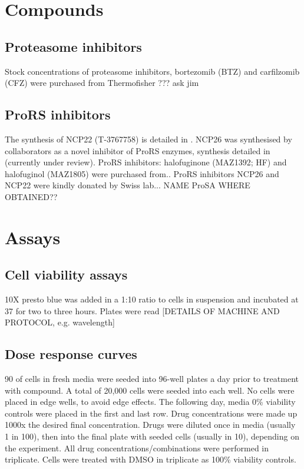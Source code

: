 \section{Compounds}

\subsection{Proteasome inhibitors}
Stock concentrations of proteasome inhibitors, bortezomib (BTZ) and carfilzomib (CFZ) were purchased from Thermofisher ??? ask jim

\subsection{ProRS inhibitors}
The synthesis of NCP22 (T-3767758) is detailed in \cite{adachi2017discovery}.
NCP26 was synthesised by collaborators as a novel inhibitor of ProRS enzymes, synthesis detailed in \cite{tyediscovery2021} (currently under review).
ProRS inhibitors: halofuginone (MAZ1392; HF) and halofuginol (MAZ1805) were purchased from..
ProRS inhibitors NCP26 and NCP22 were kindly donated by Swiss lab... NAME
ProSA
WHERE OBTAINED??


\section{Assays}
\subsection{Cell viability assays}
10X presto blue was added in a 1:10 ratio to cells in suspension and incubated at 37\C{} for two to three hours.
Plates were read [DETAILS OF MACHINE AND PROTOCOL, e.g. wavelength]

\subsection{Dose response curves}\label{subsec:method_doseresponse}
90\ul{} of cells in fresh media were seeded into 96-well plates a day prior to treatment with compound.
A total of 20,000 cells were seeded into each well.
No cells were placed in edge wells, to avoid edge effects.
The following day, media 0\% viability controls were placed in the first and last row.
Drug concentrations were made up 1000x the desired final concentration.
Drugs were diluted once in media (usually 1 in 100), then into the final plate with seeded cells (usually in 10), depending on the experiment.
All drug concentrations/combinations were performed in triplicate.
Cells were treated with DMSO in triplicate as 100\% viability controls.

